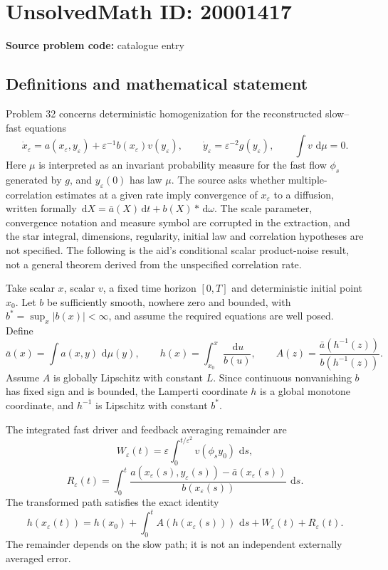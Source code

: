 \documentclass[11pt]{article}
\newcommand{\dd}{\,\mathrm{d}}
\begin{document}
\section*{UnsolvedMath ID: 20001417}
\textbf{Source problem code:} catalogue entry
\subsection{Definitions and mathematical statement}
Problem 32 concerns deterministic homogenization for the reconstructed slow--fast equations
\[
\dot x_\varepsilon=a(x_\varepsilon,y_\varepsilon)+\varepsilon^{-1}b(x_\varepsilon)v(y_\varepsilon),\qquad
\dot y_\varepsilon=\varepsilon^{-2}g(y_\varepsilon),\qquad
\int v\,\dd\mu=0.
\]
Here \(\mu\) is interpreted as an invariant probability measure for the fast flow \(\phi_s\) generated by \(g\), and \(y_\varepsilon(0)\) has law \(\mu\). The source asks whether multiple-correlation estimates at a given rate imply convergence of \(x_\varepsilon\) to a diffusion, written formally \(\dd X=\bar a(X)\dd t+b(X)*\dd\omega\). The scale parameter, convergence notation and measure symbol are corrupted in the extraction, and the star integral, dimensions, regularity, initial law and correlation hypotheses are not specified. The following is the aid's conditional scalar product-noise result, not a general theorem derived from the unspecified correlation rate.

Take scalar \(x\), scalar \(v\), a fixed time horizon \([0,T]\) and deterministic initial point \(x_0\). Let \(b\) be sufficiently smooth, nowhere zero and bounded, with \(b^*=\sup_x|b(x)|<\infty\), and assume the required equations are well posed. Define
\[
\bar a(x)=\int a(x,y)\,\dd\mu(y),\qquad
h(x)=\int_{x_0}^x\frac{\dd u}{b(u)},\qquad
A(z)=\frac{\bar a(h^{-1}(z))}{b(h^{-1}(z))}.
\]
Assume \(A\) is globally Lipschitz with constant \(L\). Since continuous nonvanishing \(b\) has fixed sign and is bounded, the Lamperti coordinate \(h\) is a global monotone coordinate, and \(h^{-1}\) is Lipschitz with constant \(b^*\).

The integrated fast driver and feedback averaging remainder are
\[
W_\varepsilon(t)=\varepsilon\int_0^{t/\varepsilon^2}v(\phi_sy_0)\,\dd s,
\]
\[
R_\varepsilon(t)=\int_0^t\frac{a(x_\varepsilon(s),y_\varepsilon(s))-\bar a(x_\varepsilon(s))}{b(x_\varepsilon(s))}\,\dd s.
\]
The transformed path satisfies the exact identity
\[
h(x_\varepsilon(t))=h(x_0)+\int_0^tA(h(x_\varepsilon(s)))\,\dd s+W_\varepsilon(t)+R_\varepsilon(t).
\]
The remainder depends on the slow path; it is not an independent externally averaged error.
\end{document}
